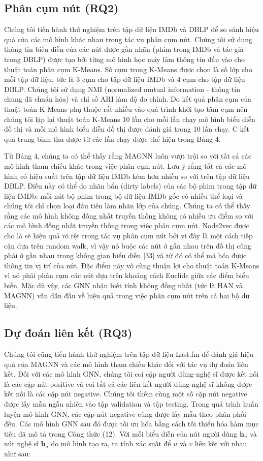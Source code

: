 \subsection{Phân cụm nút (RQ2)}
Chúng tôi tiến hành thử nghiệm trên tập dữ liệu IMDb và DBLP để so sánh hiệu quả của các mô hình khác nhau trong tác vụ phân cụm nút. Chúng tôi sử dụng thông tin biểu diễn của các nút được gắn nhãn (phim trong IMDb và tác giả trong DBLP) được tạo bởi từng mô hình học máy làm thông tin đầu vào cho thuật toán phân cụm K-Means. Số cụm trong K-Means được chọn là số lớp cho mỗi tập dữ liệu, tức là 3 cụm cho tập dữ liệu IMDb và 4 cụm cho tập dữ liệu DBLP. Chúng tôi sử dụng NMI (normalized mutual information - thông tin chung đã chuẩn hóa) và chỉ số ARI làm độ đo chính. Do kết quả phân cụm của thuật toán K-Means phụ thuộc rất nhiều vào quá trình khởi tạo tâm cụm nên chúng tôi lặp lại thuật toán K-Means 10 lần cho mỗi lần chạy mô hình biểu diễn đồ thị và mỗi mô hình biểu diễn đồ thị được đánh giá trong 10 lần chạy. C kết quả trung bình thu được từ các lần chạy được thể hiện trong Bảng 4.

Từ Bảng 4, chúng ta có thể thấy rằng MAGNN luôn vượt trội so với tất cả các mô hình tham chiếu khác trong việc phân cụm nút. Lưu ý rằng tất cả các mô hình có hiệu suất trên tập dữ liệu IMDb kém hơn nhiều so với trên tập dữ liệu DBLP. Điều này có thể do nhãn bẩn (dirty labels) của các bộ phim trong tập dữ liệu IMDb: mỗi nút bộ phim trong bộ dữ liệu IMDb gốc có nhiều thể loại và chúng tôi chỉ chọn loại đầu tiên làm nhãn lớp của chúng. Chúng ta có thể thấy rằng các mô hình không đồng nhất truyền thống không có nhiều ưu điểm so với các mô hình đồng nhất truyền thống trong việc phân cụm nút. Node2vec được cho là sẽ hiệu quả rõ rệt trong tác vụ phân cụm nút bởi vì đây là một cách tiếp cận dựa trên random walk, vì vậy nó buộc các nút ở gần nhau trên đồ thị cũng phải ở gần nhau trong không gian biểu diễn [33] và từ đó có thể mã hóa được thông tin vị trí của nút. Đặc điểm này vô cùng thuận lợi cho thuật toán K-Means vì nó phải phân cụm các nút dựa trên khoảng cách Euclide giữa các điểm biểu biễn. Mặc dù vậy, các GNN nhận biết tính không đồng nhất (tức là HAN và MAGNN) vẫn dẫn đầu về hiệu quả trong việc phân cụm nút trên cả hai bộ dữ liệu.

\subsection{Dự đoán liên kết (RQ3)}
Chúng tôi cũng tiến hành thử nghiệm trên tập dữ liệu Last.fm để đánh giá hiệu quả của MAGNN và các mô hình tham chiếu khác đối với tác vụ dự đoán liên kết. Đối với các mô hình GNN, chúng tôi coi cặp người dùng-nghệ sĩ được kết nối là các cặp nút positive và coi tất cả các liên kết người dùng-nghệ sĩ không được kết nối là các cặp nút negative. Chúng tôi thêm cùng một số cặp nút negative được lấy mẫu ngẫu nhiên vào tập validation và tập testing. Trong quá trình huấn luyện mô hình GNN, các cặp nút negative cũng được lấy mẫu theo phân phối đều. Các mô hình GNN sau đó được tối ưu hóa bằng cách tối thiểu hóa hàm mục tiêu đã mô tả trong Công thức (12). Với mỗi biểu diễn của nút người dùng $\mathbf{h}_{u}$ và nút nghệ sĩ $\mathbf{h}_{a}$ 
do mô hình tạo ra, ta tính xác suất để $u$ và $v$ liên kết với nhau như sau:

